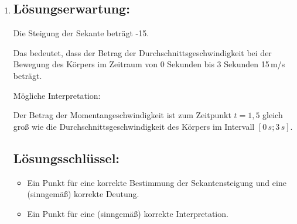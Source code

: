 \begin{langesbeispiel}
{\begin{enumerate}
	Die Geschwindigkeitsfunktion ist eine lineare Funktion, die im Intervall $[0\,s; 3\,s]$ von  $v(0)=h'(0)=0$ ausgehend monoton fallend ist - daher wird der Betrag der Geschwindigkeit immer größer.\leer
	
	Die Bewegung ist gleichmäßig beschleunigt - das heißt, der Betrag der Geschwindigkeit ist monoton wachsend.
		
	\subsection{Lösungsschlüssel:}
	\begin{itemize}
		\item Ein Ausgleichspunkt für die richtige Lösung, wobei die Einheit "`m/s"' nicht angeführt sein muss und auch -30 m/s als korrekt zu werten ist.  
		
		Die Aufgabe ist auch dann als richtig gelöst zu werten, wenn bei korrektem Ansatz das Ergebnis aufgrund eines Rechenfehlers nicht richtig ist.
		\item  Ein Punkt für eine (sinngemäß) korrekte Begründung.
	\end{itemize}
	
	\item \subsection{Lösungserwartung:}
			
		Die Steigung der Sekante beträgt -15.
		
		Das bedeutet, dass der Betrag der Durchschnittsgeschwindigkeit bei der Bewegung des Körpers im Zeitraum von 0 Sekunden bis 3 Sekunden 15\,m/s beträgt.\leer
		
		Mögliche Interpretation:
		
		Der Betrag der Momentangeschwindigkeit ist zum Zeitpunkt $t=1,5$ gleich groß wie die Durchschnittsgeschwindigkeit des Körpers im Intervall $[0\,s; 3\,s]$.


	\subsection{Lösungsschlüssel:}
	
\begin{itemize}
	\item  Ein Punkt für eine korrekte Bestimmung der Sekantensteigung und eine (sinngemäß) korrekte Deutung.
	\item Ein Punkt für eine (sinngemäß) korrekte Interpretation.
\end{itemize}

\end{enumerate}}
		\end{langesbeispiel}